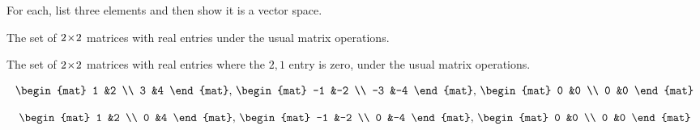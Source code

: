 
\begin{Exercise}[
name={},
title={}, 
difficulty=0,
origin={\cite{JH}}]
For each, list three elements and then show it is a vector space.

\Question The set of \( 2 \! \times \! 2 \) matrices with real entries under
        the usual matrix operations.

\Question The set of \( 2 \! \times \! 2 \) matrices with real entries where
        the $2,1$ entry is zero,  under
        the usual matrix operations.


\end{Exercise}

\begin{Answer}
\Question \begin{equation*}
            \begin{mat}
              1  &2  \\
              3  &4
            \end{mat},\,
            \begin{mat}
              -1  &-2  \\
              -3  &-4
            \end{mat},\,
            \begin{mat}
              0  &0  \\
              0  &0
            \end{mat}
          \end{equation*}

\Question \begin{equation*}
            \begin{mat}
              1  &2  \\
              0  &4
            \end{mat},\,
            \begin{mat}
              -1  &-2  \\
              0  &-4
            \end{mat},\,
            \begin{mat}
              0  &0  \\
              0  &0
            \end{mat}
          \end{equation*}


\end{Answer}
